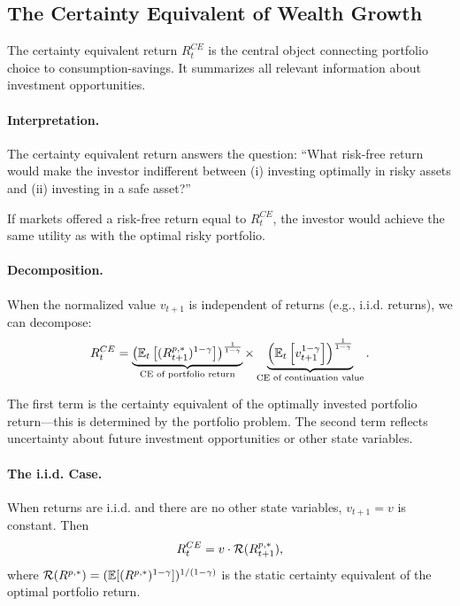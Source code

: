 \subsection{The Certainty Equivalent of Wealth Growth}
\label{subsec:ce-wealth-growth}

The certainty equivalent return $R_t^{CE}$ is the central object connecting portfolio choice to consumption-savings. It summarizes all relevant information about investment opportunities.

\paragraph{Interpretation.}

The certainty equivalent return answers the question: ``What risk-free return would make the investor indifferent between (i) investing optimally in risky assets and (ii) investing in a safe asset?''

If markets offered a risk-free return equal to $R_t^{CE}$, the investor would achieve the same utility as with the optimal risky portfolio.

\paragraph{Decomposition.}

When the normalized value $v_{t+1}$ is independent of returns (e.g., i.i.d. returns), we can decompose:
\begin{equation}
R_t^{CE} = \underbrace{\left( \mathbb{E}_t\left[ (R_{t+1}^{p,*})^{1-\gamma} \right] \right)^{\frac{1}{1-\gamma}}}_{\text{CE of portfolio return}} \times \underbrace{\left( \mathbb{E}_t\left[ v_{t+1}^{1-\gamma} \right] \right)^{\frac{1}{1-\gamma}}}_{\text{CE of continuation value}}.
\label{eq:ce-decomposition}
\end{equation}

The first term is the certainty equivalent of the optimally invested portfolio return---this is determined by the portfolio problem. The second term reflects uncertainty about future investment opportunities or other state variables.

\paragraph{The i.i.d. Case.}

When returns are i.i.d. and there are no other state variables, $v_{t+1} = v$ is constant. Then
\begin{equation}
R_t^{CE} = v \cdot \mathcal{R}(R_{t+1}^{p,*}),
\label{eq:ce-iid}
\end{equation}
where $\mathcal{R}(R^{p,*}) = (\mathbb{E}[(R^{p,*})^{1-\gamma}])^{1/(1-\gamma)}$ is the static certainty equivalent of the optimal portfolio return.

